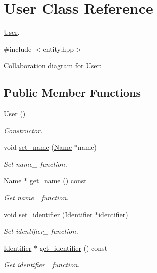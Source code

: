 \hypertarget{classUser}{}\section{User Class Reference}
\label{classUser}


\hyperlink{classUser}{User}.  




{\ttfamily \#include $<$entity.\+hpp$>$}



Collaboration diagram for User\+:
\subsection*{Public Member Functions}
\begin{DoxyCompactItemize}
\item 
\hyperlink{classUser_a4a0137053e591fbb79d9057dd7d2283d}{User} ()
\begin{DoxyCompactList}\small\item\em Constructor. \end{DoxyCompactList}\item 
void \hyperlink{classUser_aefcd99a8a253b3e14fbed0467683a448}{set\+\_\+name} (\hyperlink{className}{Name} $\ast$name)
\begin{DoxyCompactList}\small\item\em Set name\+\_\+ function. \end{DoxyCompactList}\item 
\hyperlink{className}{Name} $\ast$ \hyperlink{classUser_aaa663128ceb8d09696320195a51f125b}{get\+\_\+name} () const 
\begin{DoxyCompactList}\small\item\em Get name\+\_\+ function. \end{DoxyCompactList}\item 
void \hyperlink{classUser_a75d7b27f7e4f17b1e210a54d709b86f2}{set\+\_\+identifier} (\hyperlink{classIdentifier}{Identifier} $\ast$identifier)
\begin{DoxyCompactList}\small\item\em Set identifier\+\_\+ function. \end{DoxyCompactList}\item 
\hyperlink{classIdentifier}{Identifier} $\ast$ \hyperlink{classUser_a309a85cc3faa301a6122f78bcf60e854}{get\+\_\+identifier} () const 
\begin{DoxyCompactList}\small\item\em Get identifier\+\_\+ function. \end{DoxyCompactList}\item 

\end{DoxyCompactItemize}
